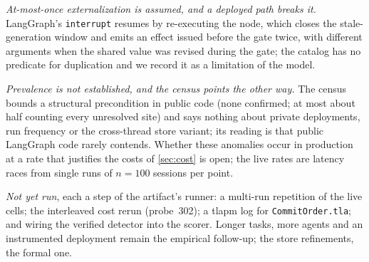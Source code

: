 \smallskip\noindent\emph{At-most-once externalization is assumed, and a
deployed path breaks it.} LangGraph's \texttt{interrupt} resumes by
re-executing the node, which closes the stale-generation window and emits an
effect issued before the gate twice, with different arguments when the shared
value was revised during the gate; the catalog has no predicate for
duplication and we record it as a limitation of the model.

\smallskip\noindent\emph{Prevalence is not established, and the census
points the other way.} The census bounds a structural precondition in public
code (none confirmed; at most about half counting every unresolved site)
and says nothing about private deployments, run frequency or the
cross-thread store variant; its reading is that public LangGraph code
rarely contends. Whether these anomalies occur in production at a rate
that justifies the costs of \cref{sec:cost} is open; the live rates are
latency races from single runs of $n=100$ sessions per point.

\smallskip\noindent\emph{Not yet run}, each a step of the artifact's runner:
a multi-run repetition of the live cells; the interleaved cost rerun
(probe~302); a tlapm log for \texttt{CommitOrder.tla}; and wiring the
verified detector into the scorer. Longer tasks, more agents and
an instrumented deployment remain the empirical follow-up; the store
refinements, the formal one.
